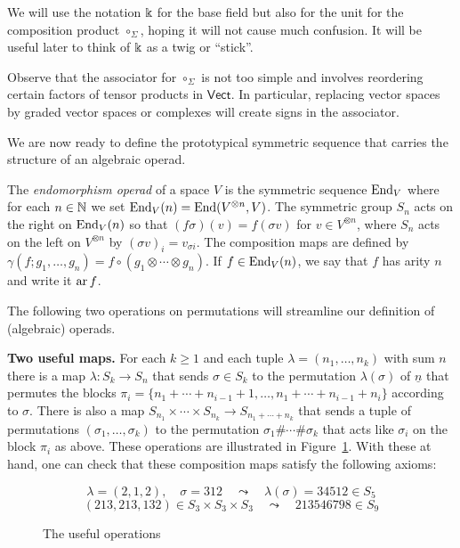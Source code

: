 We will use the notation $\Bbbk$ for the base field but
also for the unit for the composition product $\circ_\Sigma$,
hoping it will not cause much confusion. It will be useful 
later to think of $\Bbbk$ as a twig or ``stick''.

Observe that the associator for $\circ_\Sigma$ is
not too simple and involves reordering certain
factors of tensor products in $\mathsf{Vect}$. In
particular, replacing vector spaces by graded vector
spaces or complexes will create signs in the
associator.

We are now ready to define the prototypical symmetric
 sequence that carries the structure of an algebraic 
 operad. 
 
\begin{definition}
The \emph{endomorphism operad} of a space $V$ is the symmetric sequence $\operatorname{End}_V$
where for each $n\in\mathbb N$ we set $\operatorname{End}_V(n) = \operatorname{End}(V^{\otimes n}, V)$. 
The symmetric group $S_n$ acts on the right
on $\operatorname{End}_V(n)$ 
so that $(f\sigma)(v) = f(\sigma v)$ for
$v\in V^{\otimes n}$, where $S_n$ acts on
the left on $V^{\otimes n}$ by $(\sigma v)_i
= v_{\sigma i}$. The composition maps are defined
by $\gamma(f;g_1,\ldots,g_n) = f\circ (g_1\otimes\cdots \otimes g_n)$. 
If $f\in\operatorname{End}_V(n)$, we say that $f$ has arity $n$ and write
it $\operatorname{ar}{f}$.
\end{definition}


The following two operations on permutations 
will streamline our definition of (algebraic)
operads.

\medskip

\textbf{Two useful maps.} For each $k\geqslant 1$
and each tuple $\lambda = (n_1,\ldots,n_k)$ 
with sum $n$ there is a map $\lambda : S_k
 \longrightarrow S_n $
that sends $\sigma\in S_k$ to the permutation
$\lambda(\sigma)$ of $\underline{n}$ that permutes the blocks 
$\pi_i = \{n_1+\cdots+n_{i-1}+1,\ldots ,
			n_1+\cdots+n_{i-1}+n_i\}$
			according to $\sigma$.
There is also a map
$S_{n_1}\times \cdots \times  S_{n_k} 
	\longrightarrow S_{n_1+\cdots+n_k}$
	that sends a tuple of permutations 
	$(\sigma_1,\ldots,\sigma_k)$ to the
	permutation $\sigma_1\#\cdots \# \sigma_k$
	that acts like $\sigma_i$ on the block $\pi_i$
	as above. These operations are illustrated
	in Figure~\ref{fig:1}. With these at hand, 
one can check that these composition maps
satisfy the following axioms:

\begin{figure}
$$\lambda = (2,1,2), \quad \sigma = 312
	\quad \leadsto \quad \lambda(\sigma) =  34512 \in S_5
	$$
	$$
	(213,213,132)\in S_3\times S_3\times S_3 \quad \leadsto \quad 213546798\in S_9 $$
\caption{The useful operations}
\label{fig:1}
\end{figure}

